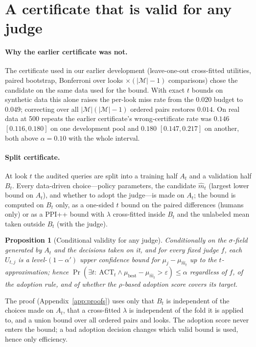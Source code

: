 \documentclass{article}
\newtheorem{proposition}{Proposition}
\newcommand{\eps}{\varepsilon}
\newcommand{\ACT}{\mathrm{ACT}}
\begin{document}
\section{A certificate that is valid for any judge}\label{sec:valid}
\paragraph{Why the earlier certificate was not.} The certificate used in our earlier development (leave-one-out cross-fitted utilities, paired bootstrap, Bonferroni over looks $\times(|\mathcal M|-1)$ comparisons) chose the candidate on the same data used for the bound. With exact $t$ bounds on synthetic data this alone raises the per-look miss rate from the $0.020$ budget to $0.049$; correcting over all $|\mathcal M|(|\mathcal M|-1)$ ordered pairs restores $0.014$. On real data at 500 repeats the earlier certificate's wrong-certificate rate was $0.146$ $[0.116,0.180]$ on one development pool and $0.180$ $[0.147,0.217]$ on another, both above $\alpha=0.10$ with the whole interval.

\paragraph{Split certificate.} At look $t$ the audited queries are split into a training half $A_t$ and a validation half $B_t$. Every data-driven choice---policy parameters, the candidate $\hat m_t$ (largest lower bound on $A_t$), and whether to adopt the judge---is made on $A_t$; the bound is computed on $B_t$ only, as a one-sided $t$ bound on the paired differences (humans only) or as a PPI++ bound with $\lambda$ cross-fitted inside $B_t$ and the unlabeled mean taken outside $B_t$ (with the judge).
\begin{proposition}[Conditional validity for any judge]\label{prop:B}
Conditionally on the $\sigma$-field generated by $A_t$ and the decisions taken on it, and for every fixed judge $f$, each $U_{t,j}$ is a level-$(1-\alpha')$ upper confidence bound for $\mu_j-\mu_{\hat m_t}$ up to the $t$-approximation; hence $\Pr(\exists t:\ \ACT_t\wedge\mu_{\mathrm{best}}-\mu_{\hat m_t}>\eps)\le\alpha$ regardless of $f$, of the adoption rule, and of whether the $\rho$-based adoption score covers its target.
\end{proposition}
The proof (Appendix~\ref{app:proofs}) uses only that $B_t$ is independent of the choices made on $A_t$, that a cross-fitted $\lambda$ is independent of the fold it is applied to, and a union bound over all ordered pairs and looks. The adoption score never enters the bound; a bad adoption decision changes which valid bound is used, hence only efficiency.
\end{document}
